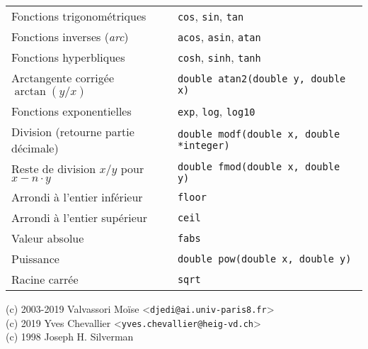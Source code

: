 \documentclass{article}
\newcommand{\cd}{\lstinline}
\begin{document}
\begin{multicols*}{3}
\begin{tabularx}{\linewidth}{Xl}
  Fonctions trigonométriques & \cd{cos}, \cd{sin}, \cd{tan} \\
  Fonctions inverses (\emph{arc}) & \cd{acos}, \cd{asin}, \cd{atan} \\
  Fonctions hyperbliques & \cd{cosh}, \cd{sinh}, \cd{tanh} \\
  Arctangente corrigée $\arctan(y / x)$ & \cd{double atan2(double y, double x)} \\
  Fonctions exponentielles & \cd{exp}, \cd{log}, \cd{log10} \\
  Division (retourne partie décimale) & \cd{double modf(double x, double *integer)} \\
  Reste de division $x/y$ pour $x - n \cdot y$ & \cd{double fmod(double x, double y)} \\
  Arrondi à l'entier inférieur & \cd{floor} \\
  Arrondi à l'entier supérieur & \cd{ceil} \\
  Valeur absolue & \cd{fabs} \\
  Puissance & \cd{double pow(double x, double y)} \\
  Racine carrée & \cd{sqrt} \\
\end{tabularx}



{
  \color{gray}
  \small
  (c) 2003-2019 Valvassori Moïse <\texttt{djedi@ai.univ-paris8.fr}> \\
  (c) 2019 Yves Chevallier <\texttt{yves.chevallier@heig-vd.ch}> \\
  (c) 1998 Joseph H. Silverman
}
\end{multicols*}
\end{document}
